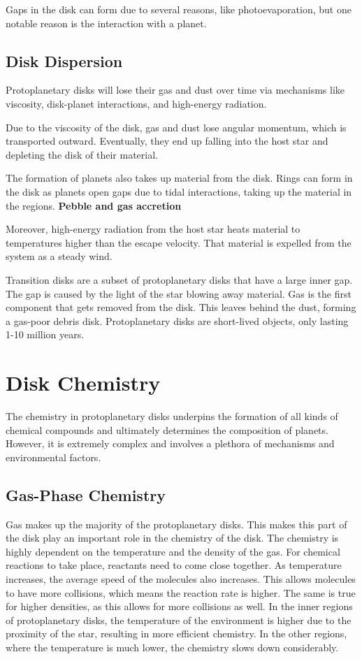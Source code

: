 \documentclass[oneside, single, authoryear, semicolon, 12pt]{lion-msc}
\newcommand{\4}{$_4$}
\newcommand{\3}{$_3$}
\newcommand{\2}{$_2$}
\begin{document}
Gaps in the disk can form due to several reasons, like photoevaporation, but one notable reason is the interaction with a planet.

\subsection{Disk Dispersion}
Protoplanetary disks will lose their gas and dust over time via mechanisms like viscosity, disk-planet interactions, and high-energy radiation.

Due to the viscosity of the disk, gas and dust lose angular momentum, which is transported outward. Eventually, they end up falling into the host star and depleting the disk of their material. 

The formation of planets also takes up material from the disk. Rings can form in the disk as planets open gaps due to tidal interactions, taking up the material in the regions. \textbf{Pebble and gas accretion}

Moreover, high-energy radiation from the host star heats material to temperatures higher than the escape velocity. That material is expelled from the system as a steady wind. 

Transition disks are a subset of protoplanetary disks that have a large inner gap. The gap is caused by the light of the star blowing away material. Gas is the first component that gets removed from the disk. This leaves behind the dust, forming a gas-poor debris disk. Protoplanetary disks are short-lived objects, only lasting 1-10 million years. 


\section{Disk Chemistry}
The chemistry in protoplanetary disks underpins the formation of all kinds of chemical compounds and ultimately determines the composition of planets.  However, it is extremely complex and involves a plethora of mechanisms and environmental factors. 

\subsection{Gas-Phase Chemistry}
Gas makes up the majority of the protoplanetary disks. This makes this part of the disk play an important role in the chemistry of the disk. The chemistry is highly dependent on the temperature and the density of the gas. For chemical reactions to take place, reactants need to come close together. As temperature increases, the average speed of the molecules also increases. This allows molecules to have more collisions, which means the reaction rate is higher. The same is true for higher densities, as this allows for more collisions as well. In the inner regions of protoplanetary disks, the temperature of the environment is higher due to the proximity of the star, resulting in more efficient chemistry. In the other regions, where the temperature is much lower, the chemistry slows down considerably. 
\end{document}
